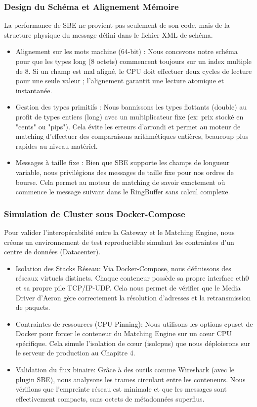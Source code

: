 \subsubsection{Design du Schéma et Alignement Mémoire}

La performance de SBE ne provient pas seulement de son code, mais de la structure physique du message défini dans le fichier XML de schéma.

\begin{itemize}
    \item Alignement sur les mots machine (64-bit) : Nous concevons notre schéma pour que les types long (8 octets) commencent toujours sur un index multiple de 8. Si un champ est mal aligné, le CPU doit effectuer deux cycles de lecture pour une seule valeur ; l'alignement garantit une lecture atomique et instantanée.
    \item Gestion des types primitifs : Nous bannissons les types flottants (double) au profit de types entiers (long) avec un multiplicateur fixe (ex: prix stocké en "cents" ou "pips"). Cela évite les erreurs d'arrondi et permet au moteur de matching d'effectuer des comparaisons arithmétiques entières, beaucoup plus rapides au niveau matériel.
    \item Messages à taille fixe : Bien que SBE supporte les champs de longueur variable, nous privilégions des messages de taille fixe pour nos ordres de bourse. Cela permet au moteur de matching de savoir exactement où commence le message suivant dans le RingBuffer sans calcul complexe.
\end{itemize}

\subsubsection{Simulation de Cluster sous Docker-Compose}

Pour valider l'interopérabilité entre la Gateway et le Matching Engine, nous créons un environnement de test reproductible simulant les contraintes d'un centre de données (Datacenter).

\begin{itemize}
    \item Isolation des Stacks Réseau: Via Docker-Compose, nous définissons des réseaux virtuels distincts. Chaque conteneur possède sa propre interface eth0 et sa propre pile TCP/IP-UDP. Cela nous permet de vérifier que le Media Driver d'Aeron gère correctement la résolution d'adresses et la retransmission de paquets.
    \item Contraintes de ressources (CPU Pinning): Nous utilisons les options cpuset de Docker pour forcer le conteneur du Matching Engine sur un cœur CPU spécifique. Cela simule l'isolation de cœur (isolcpus) que nous déploierons sur le serveur de production au Chapitre 4.
    \item Validation du flux binaire: Grâce à des outils comme Wireshark (avec le plugin SBE), nous analysons les trames circulant entre les conteneurs. Nous vérifions que l'empreinte réseau est minimale et que les messages sont effectivement compacts, sans octets de métadonnées superflus.
\end{itemize}


